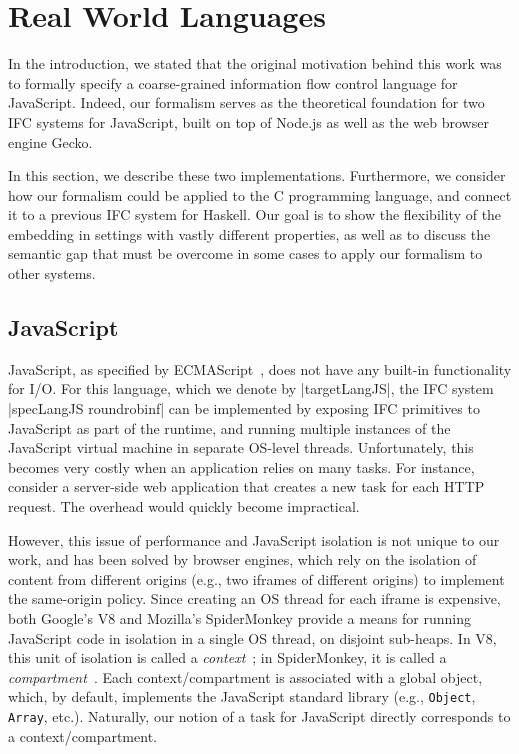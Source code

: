 \section{Real World Languages}
\label{sec:real}

In the introduction, we stated that the original motivation behind
this work was to formally specify a
coarse-grained information flow control language for JavaScript.
%
Indeed, our formalism serves as the theoretical foundation for two
IFC systems for JavaScript, built on top of Node.js as well as
the web browser engine Gecko.

In this section, we describe these two implementations.  Furthermore,
we consider how our formalism could be applied to the C programming
language, and connect it to a previous IFC system for Haskell.
%
Our goal is to show the flexibility of the embedding in settings with
vastly different properties, as well as to discuss the
semantic gap that must be overcome in some cases to apply our formalism
to other systems.
%


\subsection{JavaScript}
\label{sec:real:js}

JavaScript, as specified by
ECMAScript~\cite{ecma}, does not have any built-in
functionality for I/O.
%
For this language, which we denote by |targetLangJS|, the IFC system
|specLangJS roundrobinf| can be implemented by exposing IFC primitives
to JavaScript as part of the runtime, and running multiple instances
of the JavaScript virtual machine in separate OS-level threads.
%
Unfortunately, this becomes very costly when an application relies on
many tasks.
%
For instance, consider a server-side web application that
creates a new task for each HTTP request.  The overhead would
quickly become impractical.

However, this issue of performance and JavaScript isolation is not
unique to our work, and has been solved by browser engines,
which
rely on the isolation of content from
different origins (e.g., two iframes of different origins) to
implement the same-origin policy.
%
Since creating an OS thread for each iframe is expensive, both
Google's V8 and Mozilla's SpiderMonkey provide a means for running
JavaScript code in isolation in a single OS thread,
on disjoint sub-heaps.
%
In V8, this unit of isolation is called a \emph{context}~\tocite{}; in
SpiderMonkey, it is called a \emph{compartment}~\tocite{}.
%
Each context/compartment is associated with a global object, which, by
default, implements the JavaScript standard library (e.g.,
\verb|Object|, \verb|Array|, etc.).
%
Naturally, our notion of a task for JavaScript directly corresponds to
a context/compartment.


